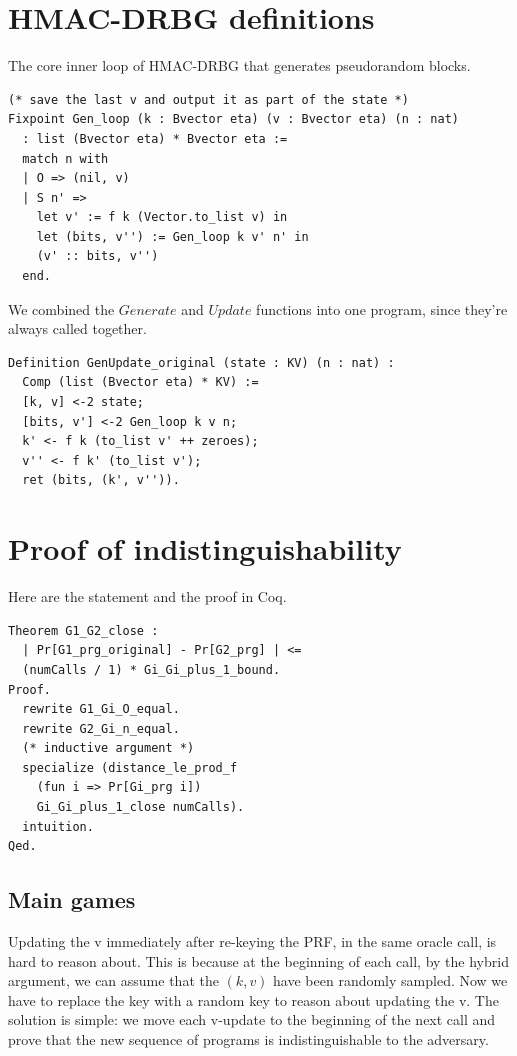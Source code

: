 \documentclass[12pt,lot, lof]{puthesis}
\begin{document}
{\section{HMAC-DRBG definitions}

The core inner loop of HMAC-DRBG that generates pseudorandom blocks. 

\begin{lstlisting}
(* save the last v and output it as part of the state *)
Fixpoint Gen_loop (k : Bvector eta) (v : Bvector eta) (n : nat)
  : list (Bvector eta) * Bvector eta :=
  match n with
  | O => (nil, v)
  | S n' =>
    let v' := f k (Vector.to_list v) in
    let (bits, v'') := Gen_loop k v' n' in
    (v' :: bits, v'')           
  end.
\end{lstlisting}

We combined the $Generate$ and $Update$ functions into one program, since they're always called together.

\begin{lstlisting}
Definition GenUpdate_original (state : KV) (n : nat) :
  Comp (list (Bvector eta) * KV) :=
  [k, v] <-2 state;
  [bits, v'] <-2 Gen_loop k v n;
  k' <- f k (to_list v' ++ zeroes);
  v'' <- f k' (to_list v');
  ret (bits, (k', v'')).
\end{lstlisting}

\section{Proof of indistinguishability}

Here are the statement and the proof in Coq. 

\begin{lstlisting}
Theorem G1_G2_close :
  | Pr[G1_prg_original] - Pr[G2_prg] | <= 
  (numCalls / 1) * Gi_Gi_plus_1_bound.
Proof.
  rewrite G1_Gi_O_equal.
  rewrite G2_Gi_n_equal.
  (* inductive argument *)
  specialize (distance_le_prod_f 
  	(fun i => Pr[Gi_prg i]) 
	Gi_Gi_plus_1_close numCalls).
  intuition.
Qed.
\end{lstlisting}

\subsection{Main games}

Updating the v immediately after re-keying the PRF, in the same oracle call, is hard to reason about. This is because at the beginning of each call, by the hybrid argument, we can assume that the $(k,v)$ have been randomly sampled. Now we have to replace the key with a random key to reason about updating the v. The solution is simple: we move each v-update to the beginning of the next call and prove that the new sequence of programs is indistinguishable to the adversary. 

}
\end{document}
